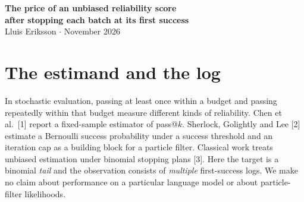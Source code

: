 \documentclass[11pt]{article}
\begin{document}
\begin{center}{\LARGE\bfseries The price of an unbiased reliability score\\ after stopping each batch at its first success}\\[8pt]
Lluis Eriksson \quad $\cdot$  November 2026
\end{center}
\begin{abstract}
Suppose a benchmark logs independent batches of identical Bernoulli trials, terminating each batch at its first success or its own cap. Can these logs estimate the chance of at least $m$ successes in the full budget of $T$ trials, where $m$ is the number of batches? Among all nonnegative scores unbiased for every success probability, the smallest possible upper bound is $\binom{T-1}{m-1}$, regardless of how the budget is split. An explicit score attains this bound and minimizes variance at every success probability within the nonnegative unbiased class. Balancing the batch caps minimizes that variance at fixed full budget, while increasing the expected number of trials actually observed. With unrestricted batch-specific success probabilities a nonnegative unbiased score does not exist for $1<m<T$. At a fixed common cap, persistent variation in task difficulty can make the expected score exponentially small relative to the target, even when the target itself is rare. With two attempts per task the mean underestimates the target for unequal interior probabilities. For any fixed cap we derive the log rate at which calibration changes as task failures become sparse, including examples with a full target of one and a limiting mean score strictly below one.
\end{abstract}
\section*{The estimand and the log}
In stochastic evaluation, passing at least once within a budget and passing repeatedly within that budget measure different kinds of reliability. Chen et al.\ [1] report a fixed-sample estimator of pass@$k$. Sherlock, Golightly and Lee [2] estimate a Bernoulli success probability under a success threshold and an iteration cap as a building block for a particle filter. Classical work treats unbiased estimation under binomial stopping plans [3]. Here the target is a binomial \emph{tail} and the observation consists of \emph{multiple} first-success logs. We make no claim about performance on a particular language model or about particle-filter likelihoods.
\end{document}
